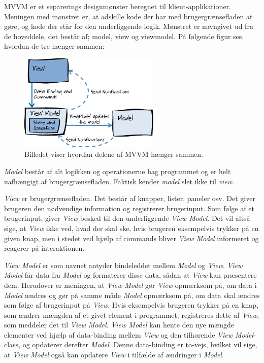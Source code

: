 MVVM er et separerings designmønster beregnet til klient-applikationer. Meningen med mønstret er, at adskille kode der har med brugergrænsefladen at gøre, og kode der står for den underliggende logik. Mønstret er navngivet ud fra de hoveddele, det består af; model, view og viewmodel. På følgende figur ses, hvordan de tre hænger sammen:

\begin{figure}[H]
\centering
\includegraphics[width=0.6\textwidth]{Billeder/MVVM.png}
\caption{Billedet viser hvordan delene af MVVM hænger sammen.\cite{msdn1}}
\label{MVVM1}
\end{figure}

\itemize

\item \textit{Model} består af alt logikken og operationerne bag programmet og er helt uafhængigt af brugergrænsefladen. Faktisk kender \textit{model} slet ikke til \textit{view}.

\item \textit{View} er brugergrænsefladen. Det består af knapper, lister, paneler osv. Det giver brugeren den nødvendige information og registrerer brugerinput. Som følge af et brugerinput, giver \textit{View} besked til den underliggende \textit{View Model}. Det vil altså sige, at \textit{View} ikke ved, hvad der skal ske, hvis brugeren eksempelvis trykker på en given knap, men i stedet ved hjælp af commands bliver \textit{View Model} informeret og reagerer på interaktionen.  

\item \textit{View Model} er som navnet antyder bindeleddet mellem \textit{Model} og \textit{View}. \textit{View Model} får data fra \textit{Model} og formaterer disse data, sådan at \textit{View} kan præsentere dem. Herudover er meningen, at \textit{View Model} gør \textit{View} opmærksom på, om data i \textit{Model} ændres og gør på samme måde \textit{Model} opmærksom på, om data skal ændres som følge af brugerinput på \textit{View}. Hvis eksempelvis brugeren trykker på en knap, som ændrer mængden af et givet element i programmet, registreres dette af \textit{View}, som meddeler det til \textit{View Model}. \textit{View Model} kan hente den nye mængde elementer ved hjælp af data-binding mellem \textit{View} og den tilhørende \textit{View Model}-class, og opdaterer derefter \textit{Model}. Denne data-binding er to-vejs, hvilket vil sige, at \textit{View Model} også kan opdatere \textit{View} i tilfælde af ændringer i \textit{Model}.
\enditemize

